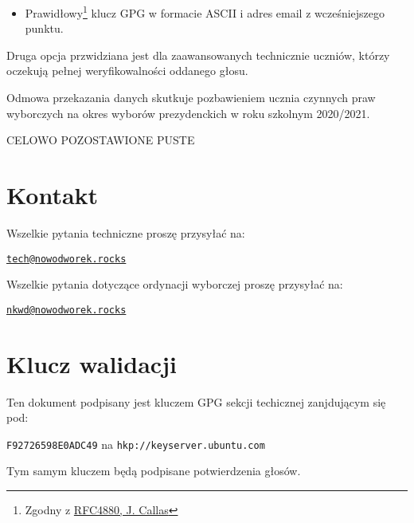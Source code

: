 \begin{itemize}
  \item Prawidłowy\footnote{Zgodny z \href{https://tools.ietf.org/html/rfc4880}{RFC4880, J. Callas}} klucz GPG w formacie ASCII i adres email z wcześniejszego punktu.
\end{itemize}
\vspace{0.3cm} %

Druga opcja przwidziana jest dla zaawansowanych technicznie uczniów, którzy oczekują pełnej weryfikowalności oddanego głosu.\par
Odmowa przekazania danych skutkuje pozbawieniem ucznia czynnych praw wyborczych na okres wyborów prezydenckich w roku szkolnym 2020/2021.

\vfill
\begin{center}
\normalsize \textcolor{white!30!black}{CELOWO POZOSTAWIONE PUSTE}\end{center}
\vfill

\newpage

\vspace{3cm}
\appendix
\section*{}

\section{Kontakt}

Wszelkie pytania techniczne proszę przysyłać na:
\begin{center}\href{mailto:tech@nowodworek.rocks}{\texttt{tech@nowodworek.rocks}}\end{center}
Wszelkie pytania dotyczące ordynacji wyborczej proszę przysyłać na:
\begin{center}\href{mailto:nkwd@nowodworek.rocks}{\texttt{nkwd@nowodworek.rocks}}\end{center}

\section{Klucz walidacji}

Ten dokument podpisany jest kluczem GPG sekcji techicznej zanjdującym się pod:
\begin{center}\texttt{F92726598E0ADC49} na \texttt{hkp://keyserver.ubuntu.com}\\ \end{center}
\noindent Tym samym kluczem będą podpisane potwierdzenia głosów.

